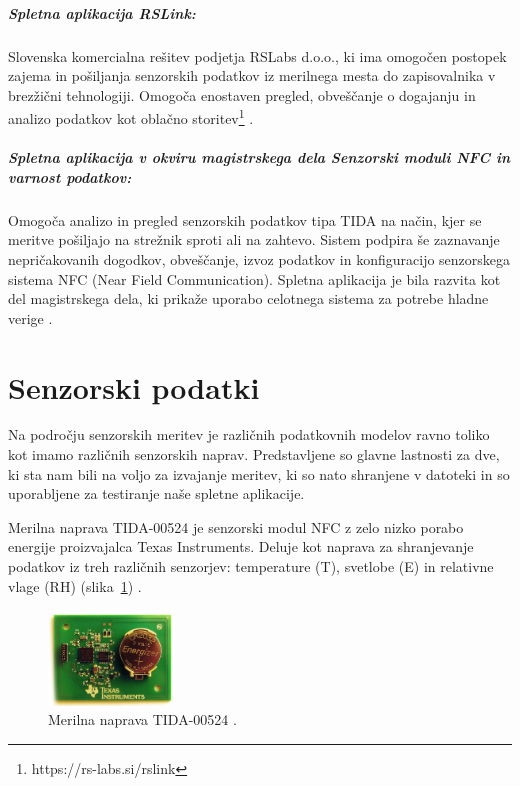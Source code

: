\documentclass[a4paper, 12pt]{book}
\begin{document}
\subparagraph{\textbf{Spletna aplikacija RSLink:}}  
Slovenska komercialna rešitev podjetja RSLabs d.o.o., ki ima omogočen postopek zajema in pošiljanja senzorskih podatkov iz merilnega mesta do zapisovalnika v brezžični tehnologiji. Omogoča enostaven pregled, obveščanje o dogajanju in analizo podatkov kot oblačno storitev\footnote{https://rs-labs.si/rslink} \cite{rslink}.


\subparagraph{\textbf{Spletna aplikacija v okviru magistrskega dela Senzorski moduli NFC in varnost podatkov:}}  
Omogoča analizo in pregled senzorskih podatkov tipa TIDA na način, kjer se meritve pošiljajo na strežnik sproti ali na zahtevo. Sistem podpira še zaznavanje nepričakovanih dogodkov, obveščanje, izvoz podatkov in konfiguracijo senzorskega sistema NFC (Near Field Communication). Spletna aplikacija je bila razvita kot del magistrskega dela, ki prikaže uporabo celotnega sistema za potrebe hladne verige \cite{magistrska-crnigoj}.


\section{Senzorski podatki}

Na področju senzorskih meritev je različnih podatkovnih modelov ravno toliko kot imamo različnih senzorskih naprav. Predstavljene so glavne lastnosti za dve, ki sta nam bili na voljo za izvajanje meritev, ki so nato shranjene v datoteki in so uporabljene za testiranje naše spletne aplikacije.

\vspace{5mm}

Merilna naprava TIDA-00524 je senzorski modul NFC z zelo nizko porabo energije proizvajalca Texas Instruments. Deluje kot naprava za shranjevanje podatkov iz treh različnih senzorjev: temperature (T), svetlobe (E) in relativne vlage (RH) (slika~\ref{merilna-naprava-tida}) \cite{dialoger-tida}.

\begin{figure}[h]
\begin{center}
\includegraphics[width=0.3\textwidth]{slike/merilna-naprava-tida.png}
\end{center}
\caption{Merilna naprava TIDA-00524 \cite{dialoger-tida}.}
\label{merilna-naprava-tida}
\end{figure}
\end{document}
